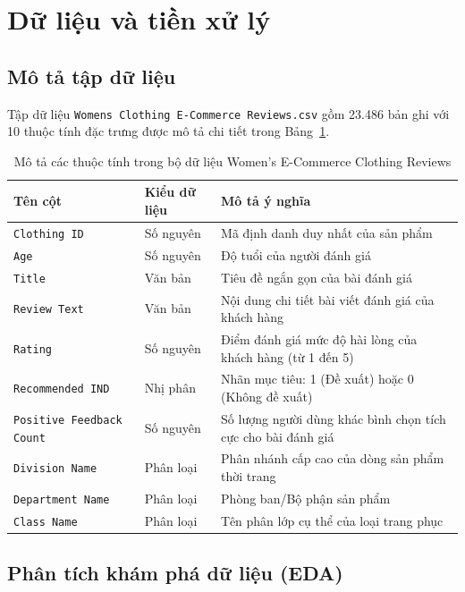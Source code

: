 \section{Dữ liệu và tiền xử lý}

\subsection{Mô tả tập dữ liệu}
Tập dữ liệu \texttt{Womens Clothing E-Commerce Reviews.csv} gồm 23.486 bản ghi với 10 thuộc tính đặc trưng được mô tả chi tiết trong Bảng~\ref{tab:dataset_desc}.

\begin{table}[H]
\centering
\renewcommand{\arraystretch}{1.15}
\begin{tabularx}{\textwidth}{|l|l|X|}
\hline
\textbf{Tên cột} & \textbf{Kiểu dữ liệu} & \textbf{Mô tả ý nghĩa} \\ \hline
\texttt{Clothing ID} & Số nguyên & Mã định danh duy nhất của sản phẩm \\ \hline
\texttt{Age} & Số nguyên & Độ tuổi của người đánh giá \\ \hline
\texttt{Title} & Văn bản & Tiêu đề ngắn gọn của bài đánh giá \\ \hline
\texttt{Review Text} & Văn bản & Nội dung chi tiết bài viết đánh giá của khách hàng \\ \hline
\texttt{Rating} & Số nguyên & Điểm đánh giá mức độ hài lòng của khách hàng (từ 1 đến 5) \\ \hline
\texttt{Recommended IND} & Nhị phân & Nhãn mục tiêu: 1 (Đề xuất) hoặc 0 (Không đề xuất) \\ \hline
\texttt{Positive Feedback Count} & Số nguyên & Số lượng người dùng khác bình chọn tích cực cho bài đánh giá \\ \hline
\texttt{Division Name} & Phân loại & Phân nhánh cấp cao của dòng sản phẩm thời trang \\ \hline
\texttt{Department Name} & Phân loại & Phòng ban/Bộ phận sản phẩm \\ \hline
\texttt{Class Name} & Phân loại & Tên phân lớp cụ thể của loại trang phục \\ \hline
\end{tabularx}
\caption{Mô tả các thuộc tính trong bộ dữ liệu Women's E-Commerce Clothing Reviews}
\label{tab:dataset_desc}
\end{table}

\subsection{Phân tích khám phá dữ liệu (EDA)}

